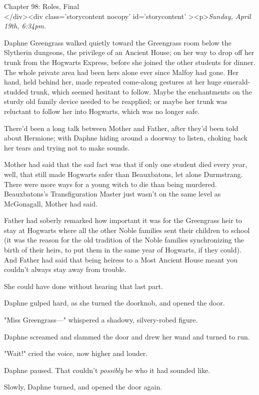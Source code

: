 
Chapter 98: Roles, Final\\
</div><div  class='storycontent nocopy' id='storycontent' ><p>\emph{Sunday, April 19th, 6:34pm.}

Daphne Greengrass walked quietly toward the Greengrass room below the Slytherin dungeons, the privilege of an Ancient House; on her way to drop off her trunk from the Hogwarts Express, before she joined the other students for dinner. The whole private area had been hers alone ever since Malfoy had gone. Her hand, held behind her, made repeated come-along gestures at her huge emerald-studded trunk, which seemed hesitant to follow. Maybe the enchantments on the sturdy old family device needed to be reapplied; or maybe her trunk was reluctant to follow her into Hogwarts, which was no longer safe.

There'd been a long talk between Mother and Father, after they'd been told about Hermione; with Daphne hiding around a doorway to listen, choking back her tears and trying not to make sounds.

Mother had said that the sad fact was that if only one student died every year, well, that still made Hogwarts safer than Beauxbatons, let alone Durmstrang. There were more ways for a young witch to die than being murdered. Beauxbatons's Transfiguration Master just wasn't on the same level as McGonagall, Mother had said.

Father had soberly remarked how important it was for the Greengrass heir to stay at Hogwarts where all the other Noble families sent their children to school (it was the reason for the old tradition of the Noble families synchronizing the birth of their heirs, to put them in the same year of Hogwarts, if they could). And Father had said that being heiress to a Most Ancient House meant you couldn't always stay away from trouble.

She could have done without hearing that last part.

Daphne gulped hard, as she turned the doorknob, and opened the door.

"Miss Greengrass---" whispered a shadowy, silvery-robed figure.

Daphne screamed and slammed the door and drew her wand and turned to run.

"Wait!" cried the voice, now higher and louder.

Daphne paused. That couldn't \emph{possibly} be who it had sounded like.

Slowly, Daphne turned, and opened the door again.

